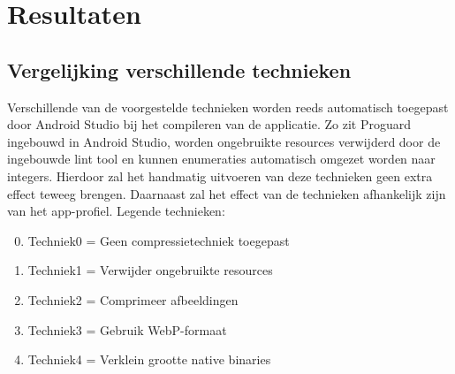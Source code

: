
\chapter{Resultaten}
\label{ch:resultaten}

\section{Vergelijking verschillende technieken}
\label{sec:technieken}

Verschillende van de voorgestelde technieken worden reeds automatisch toegepast door Android Studio bij het compileren van de applicatie. Zo zit Proguard ingebouwd in Android Studio, worden ongebruikte resources verwijderd door de ingebouwde lint tool en kunnen enumeraties automatisch omgezet worden naar integers. Hierdoor zal het handmatig uitvoeren van deze technieken geen extra effect teweeg brengen. Daarnaast zal het effect van de technieken afhankelijk zijn van het app-profiel. 
Legende technieken: 
\begin{enumerate}
	\setcounter{enumi}{-1}
	\item Techniek0 = Geen compressietechniek toegepast
	\item Techniek1 = Verwijder ongebruikte resources
	\item Techniek2 = Comprimeer afbeeldingen
	\item Techniek3 = Gebruik WebP-formaat
	\item Techniek4 = Verklein grootte native binaries
\end{enumerate}
